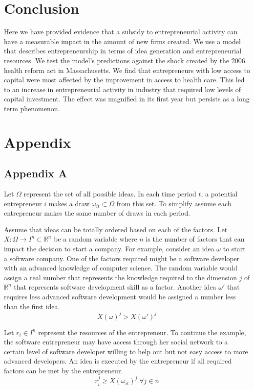 \documentclass[12pt]{article}
\begin{document}
\section*{Conclusion}
Here we have provided evidence that a subsidy to entrepreneurial activity can have a measurable impact in the amount of new firms created. We use a model that describes entrepreneurship in terms of idea generation and entrepreneurial resources. We test the model's predictions against the shock created by the 2006 health reform act in Massachusetts. We find that entrepreneurs with low access to capital were most affected by the improvement in access to health care. This led to an increase in entrepreneurial activity in industry that required low levels of capital investment. The effect was magnified in its first year but persists as a long term phenomenon. 

\appendix
\section*{Appendix}
\subsection*{Appendix A}

Let $\Omega$ represent the set of all possible ideas. In each time period $t$, a potential entrepreneur $i$ makes a draw $\omega_{it} \subset \Omega$ from this set. To simplify assume each entrepreneur makes the same number of draws in each period. 

Assume that ideas can be totally ordered based on each of the factors. Let $X:\Omega\to I^n \subset \mathbb{R}^n$ be a random variable where $n$ is the number of factors that can impact the decision to start a company. For example, consider an idea $\omega$ to start a software company. One of the factors required might be a software developer with an advanced knowledge of computer science. The random variable would assign a real number that represents the knowledge required to the dimension $j$ of $\mathbb{R}^n$ that represents software development skill as a factor. Another idea $\omega'$ that requires less advanced software development would be assigned a number less than the first idea. 
$$X(\omega)^j > X(\omega')^j $$

Let $r_i \in I^n$ represent the resources of the entrepreneur. To continue the example, the software entrepreneur may have access through her social network to a certain level of software developer willing to help out but not easy access to more advanced developers. An idea is executed by the entrepreneur if all required factors can be met by the entrepreneur. 
$$r_i^j \ge X(\omega_{it})^j \; \forall j \in n$$
\end{document}
